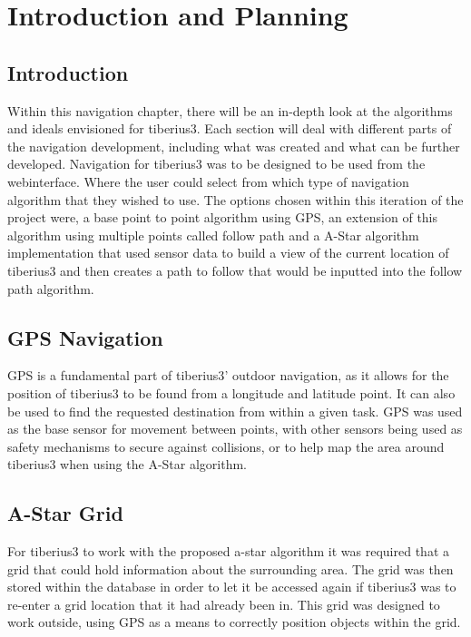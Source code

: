 \section{Introduction and Planning}

\subsection{Introduction}
Within this navigation chapter, there will be an in-depth look at the algorithms and ideals envisioned for \gls{tiberius3}. Each section will deal with different parts of the navigation development, including what was created and what can be further developed.
\newline
Navigation for \gls{tiberius3} was to be designed to be used from the \gls{webinterface}. Where the user could select from which type of navigation algorithm that they wished to use. The options chosen within this iteration of the project were, a base point to point algorithm using GPS, an extension of this algorithm using multiple points called follow path and a A-Star algorithm implementation that used sensor data to build a view of the current location of \gls{tiberius3} and then creates a path to follow that would be inputted into the follow path algorithm.
\subsection{GPS Navigation}
\gls{GPS} is a fundamental part of \gls{tiberius3}' outdoor navigation, as it allows for the position of \gls{tiberius3} to be found from a longitude and latitude point. It can also be used to find the requested destination from within a given task. \gls{GPS} was used as the base sensor for movement between points, with other sensors being used as safety mechanisms to secure against collisions, or to help map the area around \gls{tiberius3} when using the A-Star algorithm.
\subsection{A-Star Grid}
For \gls{tiberius3} to work with the proposed \gls{a-star} algorithm it was required that a grid that could hold information about the surrounding area. The grid was then stored within the database in order to let it be accessed again if \gls{tiberius3} was to re-enter a grid location that it had already been in. This grid was designed to work outside, using \gls{GPS} as a means to correctly position objects within the grid.
